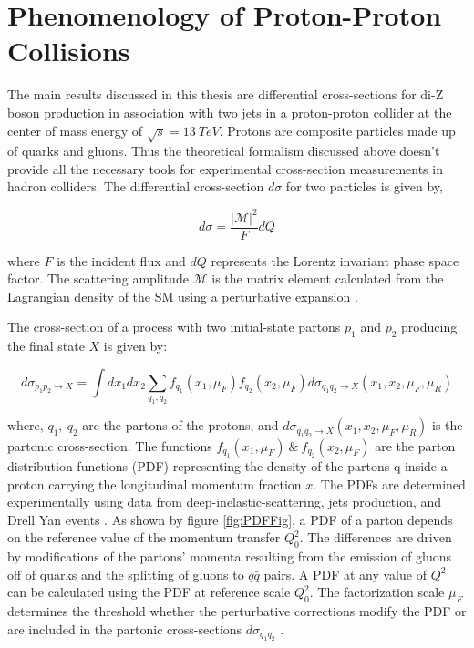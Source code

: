 \section{Phenomenology of Proton-Proton Collisions }	
\label{sec:Pheno}

The main results discussed in this thesis are differential cross-sections for di-Z boson production in association with two jets in a proton-proton collider at the center of mass energy of $\sqrt{s}=13~TeV$. Protons are composite particles made up of quarks and gluons. Thus the theoretical formalism discussed above doesn't provide all the necessary tools for experimental cross-section measurements in hadron colliders. The differential cross-section $d\sigma$ for two particles is given by, 

\begin{equation}
d\sigma  = \frac{{|\mathcal{M}|}^2}{F} dQ
\label{eqn:DiffxS}
\end{equation}

where $F$ is the incident flux and $dQ$ represents the Lorentz invariant phase space factor. The scattering amplitude $\mathcal{M}$ is the matrix element calculated from the Lagrangian density of the SM using a perturbative expansion \cite{QCDForCollider}.

The cross-section of a process with two initial-state partons $p_{1}$ and $p_{2}$ producing the final state $X$ is given by:

\begin{equation}
d\sigma_{p_{1}p_{2} \rightarrow X } = \int dx_{1} dx_{2} \sum_{q_{1},q_{2}} f_{q_{1}}(x_{1},\mu_{F})f_{q_{2}}(x_{2},\mu_{F}) d\sigma_{q_{1}q_{2}\rightarrow X } (x_{1},x_{2},\mu_{F},\mu_{R})
\label{eqn:DifferentialPartonicXS}
\end{equation}

where, $q_{1},~ q_{2}$ are the partons of the protons, and $d\sigma_{q_{1}q_{2}\rightarrow X } (x_{1},x_{2},\mu_{F},\mu_{R})$ is the partonic cross-section. The functions $f_{q_{1}}(x_{1},\mu_{F}) ~\&~ f_{q_{2}}(x_{2},\mu_{F})$ are the parton distribution functions (PDF) representing the density of the partons q inside a proton carrying the longitudinal momentum fraction $x$. The PDFs are determined experimentally using data from deep-inelastic-scattering, jets production, and Drell Yan events \cite{FixedTargetDrellYan} \cite{PDF4LHC}. As shown by figure \ref{fig:PDFFig}, a PDF of a parton depends on the reference value of the momentum transfer $Q_{0}^2$. The differences are driven by modifications of the partons' momenta resulting from the emission of gluons off of quarks and the splitting of gluons to $q\bar{q}$ pairs. A PDF at any value of $Q^2$ can be calculated using the PDF at reference scale $Q_{0}^2$. The factorization scale $\mu_{F}$ determines the threshold whether the perturbative corrections modify the PDF or are included in the partonic cross-sections $d\sigma_{q_{1}q_{2}}$ \cite{QCDForCollider}.

